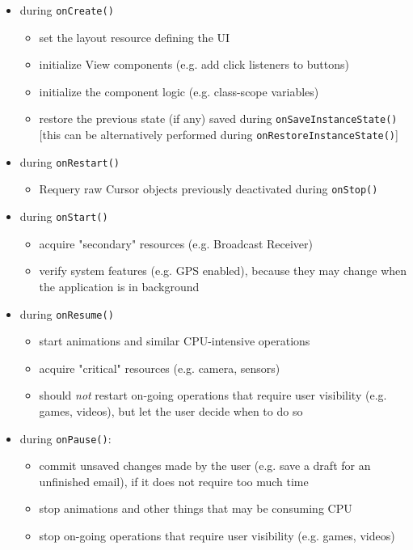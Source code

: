 \documentclass[11pt,a4paper,notitlepage]{article}
\begin{document}
\begin{itemize}
	\item during \texttt{onCreate()}
	\begin{itemize}
		\item set the layout resource defining the UI
		\item initialize View components (e.g. add click listeners to buttons)
		\item initialize the component logic (e.g. class-scope variables)
		\item restore the previous state (if any) saved during \texttt{onSaveInstanceState()} [this can be alternatively performed during \texttt{onRestoreInstanceState()}]
	\end{itemize}
	\item during \texttt{onRestart()}
	\begin{itemize}
		\item Requery raw Cursor objects previously deactivated during \texttt{onStop()}
	\end{itemize}
		\item during \texttt{onStart()}
	\begin{itemize}
		\item acquire "secondary" resources (e.g. Broadcast Receiver)
		\item verify system features (e.g. GPS enabled), because they may change when the application is in background
	\end{itemize}
	\item during \texttt{onResume()}
	\begin{itemize}
		\item start animations and similar CPU-intensive operations
		\item acquire "critical" resources (e.g. camera, sensors)
		\item should \textit{not} restart on-going operations that require user visibility (e.g. games, videos), but let the user decide when to do so
	\end{itemize}
	\item during \texttt{onPause()}:
	\begin{itemize}
		\item commit unsaved changes made by the user (e.g. save a draft for an unfinished email), if it does not require too much time
		\item stop animations and other things that may be consuming CPU
		\item stop on-going operations that require user visibility (e.g. games, videos)

\end{itemize}
\end{itemize}
\end{document}
